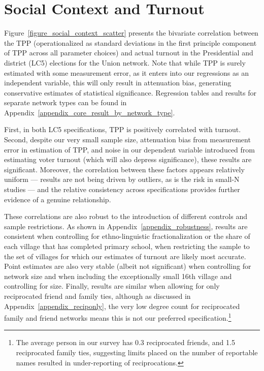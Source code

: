 \documentclass[12pt]{article}
\begin{document}
\section{Social Context and Turnout}\label{section_results}

Figure~\ref{figure_social_context_scatter} presents the bivariate correlation between the TPP (operationalized as standard deviations in the first principle component of TPP across all parameter choices) and actual turnout in the Presidential and district (LC5) elections for the Union network. Note that while TPP is surely estimated with some measurement error, as it enters into our regressions as an independent variable, this will only result in attenuation bias, generating conservative estimates of statistical significance. Regression tables and results for separate network types can be found in Appendix~\ref{appendix_core_result_by_network_type}.

First, in both LC5 specifications, TPP is positively correlated with turnout. Second, despite our very small sample size, attenuation bias from measurement error in estimation of TPP, and noise in our dependent variable introduced from estimating voter turnout (which will also depress significance), these results are significant. Moreover, the correlation between these factors appears relatively uniform --- results are not being driven by outliers, as is the risk in small-N studies --- and the relative consistency across specifications provides further evidence of a genuine relationship.

These correlations are also robust to the introduction of different controls and sample restrictions. As shown in Appendix~\ref{appendix_robustness}, results are consistent when controlling for ethno-linguistic fractionalization or the share of each village that has completed primary school, when restricting the sample to the set of villages for which our estimates of turnout are likely most accurate. Point estimates are also very stable (albeit not significant) when controlling for network size and when including the exceptionally small 16th village and controlling for size. Finally, results are similar when allowing for only reciprocated friend and family ties, although as discussed in Appendix~\ref{appendix_reciponly}, the very low degree count for reciprocated family and friend networks means this is not our preferred specification.\footnote{The average person in our survey has 0.3 reciprocated friends, and 1.5 reciprocated family ties, suggesting limits placed on the number of reportable names resulted in under-reporting of reciprocations.}
\end{document}

